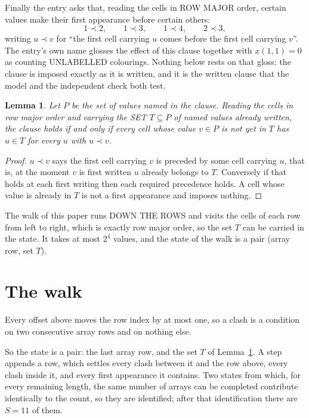 \documentclass[11pt,a4paper]{article}
\theoremstyle{plain}
\newtheorem{lemma}[theorem]{Lemma}
\theoremstyle{definition}
\begin{document}
Finally the entry asks that, reading the cells in ROW MAJOR order, certain values make their
first appearance before certain others:
\[
1\prec 2,\qquad 1\prec 3,\qquad 1\prec 4,\qquad 2\prec 3 ,
\]
writing $u\prec v$ for ``the first cell carrying $u$ comes before the first cell carrying
$v$''. The entry's own name glosses the effect of this clause together with $x(1,1)=0$ as
counting UNLABELLED colourings. Nothing below rests on that gloss: the clause is imposed
exactly as it is written, and it is the written clause that the model and the independent
check both test.

\begin{lemma}\label{lem:seen}
Let $P$ be the set of values named in the clause. Reading the cells in row major order and
carrying the SET $T\subseteq P$ of named values already written, the clause holds if and only
if every cell whose value $v\in P$ is not yet in $T$ has $u\in T$ for every $u$ with $u\prec v$.
\end{lemma}

\begin{proof}
$u\prec v$ says the first cell carrying $v$ is preceded by some cell carrying $u$, that is, at
the moment $v$ is first written $u$ already belongs to $T$. Conversely if that holds at each
first writing then each required precedence holds. A cell whose value is already in $T$ is not
a first appearance and imposes nothing.
\end{proof}

The walk of this paper runs DOWN THE ROWS and visits the cells of each row from left to right,
which is exactly row major order, so the set $T$ can be carried in the state. It takes at most
$2^{4}$ values, and the state of the walk is a pair (array row, set $T$).

\section{The walk}

Every offset above moves the row index by at most one, so a clash is a condition on two
consecutive array rows and on nothing else.

So the state is a pair: the last array row, and the set $T$ of Lemma~\ref{lem:seen}. A step
appends a row, which settles every clash between it and the row above, every clash inside it,
and every first appearance it contains. Two states from which, for every remaining length, the
same number of arrays can be completed contribute identically to the count, so they are
identified; after that identification there are $S=11$ of them.
\end{document}
